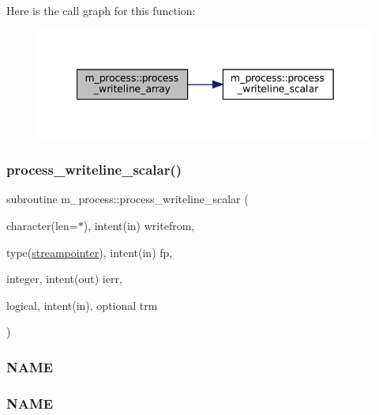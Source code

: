 Here is the call graph for this function\+:
\nopagebreak
\begin{figure}[H]
\begin{center}
\leavevmode
\includegraphics[width=342pt]{namespacem__process_a08887a918eba167ceacddf58ca084270_cgraph}
\end{center}
\end{figure}
\mbox{\label{namespacem__process_a72527c0ec0af26dcb14b8bfad6dcd482}} 
\subsubsection{\texorpdfstring{process\+\_\+writeline\+\_\+scalar()}{process\_writeline\_scalar()}}
{\footnotesize\ttfamily subroutine m\+\_\+process\+::process\+\_\+writeline\+\_\+scalar (\begin{DoxyParamCaption}\item[{character(len=$\ast$), intent(in)}]{writefrom,  }\item[{type(\mbox{\hyperlink{structm__process_1_1streampointer}{streampointer}}), intent(in)}]{fp,  }\item[{integer, intent(out)}]{ierr,  }\item[{logical, intent(in), optional}]{trm }\end{DoxyParamCaption})\hspace{0.3cm}{\ttfamily [private]}}



\subsubsection*{N\+A\+ME}

\subsubsection*{N\+A\+ME}


